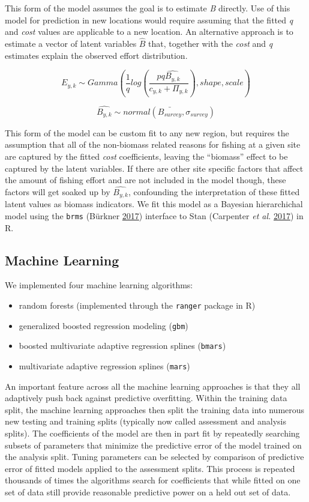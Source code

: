\documentclass[twoside,12pt,final]{ucthesis-CA2012}
\providecommand{\tightlist}{%
  \setlength{\itemsep}{0pt}\setlength{\parskip}{0pt}}
\begin{document}
\begin{ucmainmatter}
This form of the model assumes the goal is to estimate \emph{B}
directly. Use of this model for prediction in new locations would
require assuming that the fitted \emph{q} and \emph{cost} values are
applicable to a new location. An alternative approach is to estimate a
vector of latent variables \(\hat{B}\) that, together with the
\emph{cost} and \emph{q} estimates explain the observed effort
distribution.

\[E_{y,k} \sim Gamma(\frac{1}{q}log(\frac{pq\hat{B_{y,k}}}{c_{y,k} + \Pi_{y,k}}), shape, scale)\]

\[ \hat{B_{y,k}} \sim normal(\bar{B_{survey}}, \sigma_{survey})\]

This form of the model can be custom fit to any new region, but requires
the assumption that all of the non-biomass related reasons for fishing
at a given site are captured by the fitted \emph{cost} coefficients,
leaving the ``biomass'' effect to be captured by the latent variables.
If there are other site specific factors that affect the amount of
fishing effort and are not included in the model though, these factors
will get soaked up by \(\hat{B_{y,k}}\), confounding the interpretation
of these fitted latent values as biomass indicators. We fit this model
as a Bayesian hierarchichal model using the \texttt{brms} (Bürkner
\protect\hyperlink{ref-Burkner2017}{2017}) interface to Stan (Carpenter
\emph{et al.} \protect\hyperlink{ref-Carpenter2017}{2017}) in R.

\subsection{Machine Learning}\label{machine-learning}

We implemented four machine learning algorithms:
\begin{itemize}
\tightlist
\item
  random forests (implemented through the \texttt{ranger} package in R)
\item
  generalized boosted regression modeling (\texttt{gbm})
\item
  boosted multivariate adaptive regression splines (\texttt{bmars})
\item
  multivariate adaptive regression splines (\texttt{mars})
\end{itemize}
An important feature across all the machine learning approaches is that
they all adaptively push back against predictive overfitting. Within the
training data split, the machine learning approaches then split the
training data into numerous new testing and training splits (typically
now called assessment and analysis splits). The coefficients of the
model are then in part fit by repeatedly searching subsets of parameters
that minimize the predictive error of the model trained on the analysis
split. Tuning parameters can be selected by comparison of predictive
error of fitted models applied to the assessment splits. This process is
repeated thousands of times the algorithms search for coefficients that
while fitted on one set of data still provide reasonable predictive
power on a held out set of data.


\end{ucmainmatter}
\end{document}
